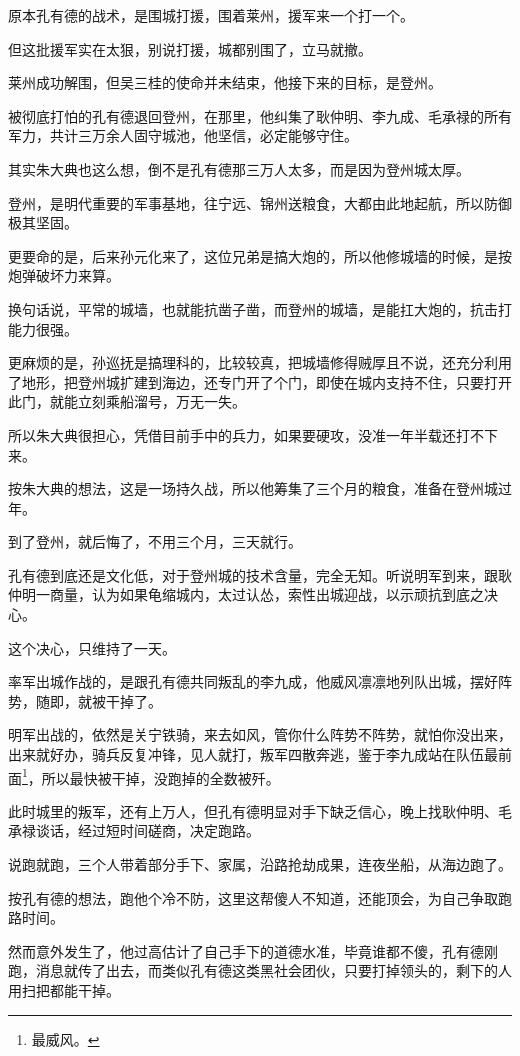 \begin{multicols}{\theparacolNo}
原本孔有德的战术，是围城打援，围着莱州，援军来一个打一个。

但这批援军实在太狠，别说打援，城都别围了，立马就撤。

莱州成功解围，但吴三桂的使命并未结束，他接下来的目标，是登州。

被彻底打怕的孔有德退回登州，在那里，他纠集了耿仲明、李九成、毛承禄的所有军力，共计三万余人固守城池，他坚信，必定能够守住。

其实朱大典也这么想，倒不是孔有德那三万人太多，而是因为登州城太厚。

登州，是明代重要的军事基地，往宁远、锦州送粮食，大都由此地起航，所以防御极其坚固。

更要命的是，后来孙元化来了，这位兄弟是搞大炮的，所以他修城墙的时候，是按炮弹破坏力来算。

换句话说，平常的城墙，也就能抗凿子凿，而登州的城墙，是能扛大炮的，抗击打能力很强。

更麻烦的是，孙巡抚是搞理科的，比较较真，把城墙修得贼厚且不说，还充分利用了地形，把登州城扩建到海边，还专门开了个门，即使在城内支持不住，只要打开此门，就能立刻乘船溜号，万无一失。

所以朱大典很担心，凭借目前手中的兵力，如果要硬攻，没准一年半载还打不下来。

按朱大典的想法，这是一场持久战，所以他筹集了三个月的粮食，准备在登州城过年。

到了登州，就后悔了，不用三个月，三天就行。

孔有德到底还是文化低，对于登州城的技术含量，完全无知。听说明军到来，跟耿仲明一商量，认为如果龟缩城内，太过认怂，索性出城迎战，以示顽抗到底之决心。

这个决心，只维持了一天。

率军出城作战的，是跟孔有德共同叛乱的李九成，他威风凛凛地列队出城，摆好阵势，随即，就被干掉了。

明军出战的，依然是关宁铁骑，来去如风，管你什么阵势不阵势，就怕你没出来，出来就好办，骑兵反复冲锋，见人就打，叛军四散奔逃，鉴于李九成站在队伍最前面\footnote{最威风。}，所以最快被干掉，没跑掉的全数被歼。

此时城里的叛军，还有上万人，但孔有德明显对手下缺乏信心，晚上找耿仲明、毛承禄谈话，经过短时间磋商，决定跑路。

说跑就跑，三个人带着部分手下、家属，沿路抢劫成果，连夜坐船，从海边跑了。

按孔有德的想法，跑他个冷不防，这里这帮傻人不知道，还能顶会，为自己争取跑路时间。

然而意外发生了，他过高估计了自己手下的道德水准，毕竟谁都不傻，孔有德刚跑，消息就传了出去，而类似孔有德这类黑社会团伙，只要打掉领头的，剩下的人用扫把都能干掉。


\end{multicols}
